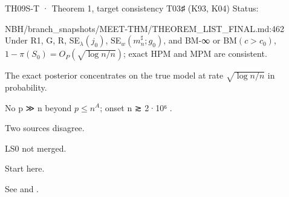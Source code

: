 \begin{card}{TH09}{S-T · Theorem 1, target consistency T03♯ (K93, K04)}
\approvedFB\quad Status: 
\begin{stmt}{NBH/branch_snapshots/MEET-THM/THEOREM_LIST_FINAL.md:462}
Under R1, G, R, SE$_\lambda(j_0)$, SE$_w(m_n^\sharp;g_0)$, and BM-∞ or BM$(c>c_0)$, $1-\pi(S_0)=O_P(\sqrt{\log n/n})$; exact HPM and MPM are consistent.
\end{stmt}
\begin{plain}The exact posterior concentrates on the true model at rate $\sqrt{\log n/n}$ in probability.\end{plain}
\begin{notproved}No p ≫ n beyond $p\le n^A$; onset n ≳ 2·10⁶ .\end{notproved}
\begin{uncertain}[example]Two sources disagree.\end{uncertain}
\begin{divergence}LS0 not merged.\end{divergence}
\begin{agentnote}Start here.\end{agentnote}
\end{card}
See  and .
